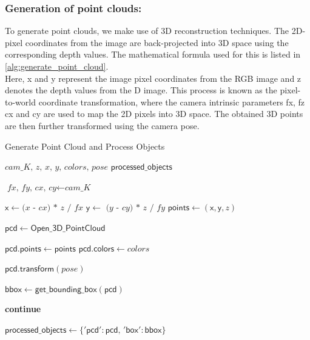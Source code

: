 \subsubsection{Generation of point clouds:}
To generate point clouds, we make use of 3D reconstruction techniques. The 2D-pixel coordinates from the image are back-projected into 3D space using the corresponding 
depth values. The mathematical formula used for this is listed  in \cref{alg:generate_point_cloud}. \\
Here, x and y represent the image pixel coordinates from the RGB image and z denotes the depth values from the D image. This process is known as 
the pixel-to-world coordinate transformation, where the camera intrinsic parameters fx, fz cx and cy are used to map the 2D pixels into 3D space. 
The obtained 3D points are then further transformed using the camera pose. 
\begin{Algorithmus}
  \caption{Generate Point Cloud and Process Objects}
  \label{alg:generate_point_cloud}
  \begin{algorithmic}
    \Require $\mathsf{\textit{cam\_K, z, x, y, colors, pose}}$
    \Ensure $\mathsf{processed\_objects}$

    \State $\mathsf{\textit{fx, fy, cx, cy}} \gets \mathsf{\textit{cam\_K}}$
    
    \State $\mathsf{x} \gets \textit{(x - cx) * z / fx}$ 
    \State $\mathsf{y} \gets \textit{ (y - cy) * z / fy}$
    \State $\mathsf{points} \gets (\mathsf{x, y}, \textit{z})$
    
    \State $\mathsf{pcd} \gets \mathsf{Open\_3D\_PointCloud}$

    \State $\mathsf{pcd.points} \gets \mathsf{points}$
    \State $\mathsf{pcd.colors} \gets \mathsf{\textit{colors}}$
    
    \State $\mathsf{pcd.transform(\textit{pose})}$

    \State $\mathsf{bbox} \gets \mathsf{get\_bounding\_box}(\mathsf{pcd})$
    
        \State \textbf{continue}           
    \EndIf

    \State $\mathsf{processed\_objects} \gets \mathsf{\{ 'pcd': pcd, \hspace{2pt}'box': bbox \}}$

  \end{algorithmic}
\end{Algorithmus}

